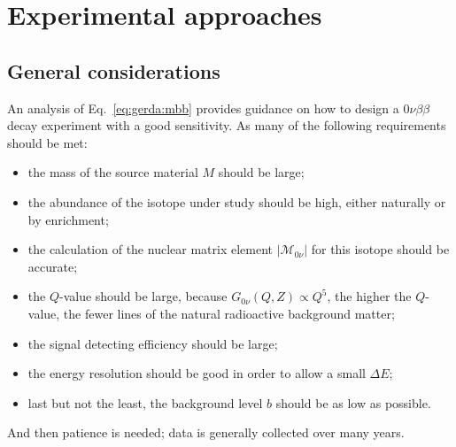 \section{Experimental approaches}
\label{sec:exp:appr}
\subsection{General considerations}
\label{sec:gencon}
An analysis of Eq.~\ref{eq:gerda:mbb} provides guidance on how to design a $0\nu\beta\beta$ decay experiment with a good sensitivity. As many of the following requirements should be met:
\begin{itemize}
\item the mass of the source material $M$ should be large;
\item the abundance of the isotope under study should be high, either naturally or by enrichment;
\item the calculation of the nuclear matrix element $|\mathcal{M}_{0\nu}|$ for this isotope should be accurate;
\item the $Q$-value should be large, because $G_{0\nu}(Q,Z) \propto Q^{5}$, the higher the $Q$-value, the fewer lines of the natural radioactive background matter;
\item the signal detecting efficiency should be large;
\item the energy resolution should be good in order to allow a small $\Delta E$;
\item last but not the least, the background level $b$ should be as low as possible.
\end{itemize}
And then patience is needed; data is generally collected over many years.


